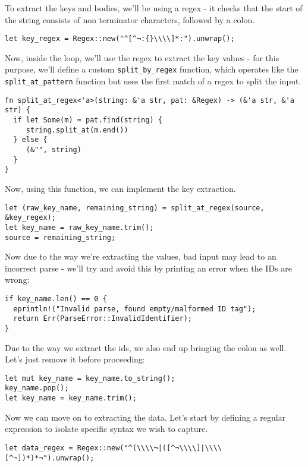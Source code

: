 \documentclass[11pt]{article}
\begin{document}
To extract the keys and bodies, we'll be using a regex - it checks that the start of the string consists of non terminator characters,
followed by a colon.
\begin{verbatim}
let key_regex = Regex::new("^[^¬:{}\\\\]*:").unwrap();
\end{verbatim}

Now, inside the loop, we'll use the regex to extract the key values - for this purpose, we'll define a custom \texttt{split\_by\_regex} function,
which operates like the \texttt{split\_at\_pattern} function but uses the first match of a regex to split the input.

\begin{verbatim}
fn split_at_regex<'a>(string: &'a str, pat: &Regex) -> (&'a str, &'a str) {
  if let Some(m) = pat.find(string) {
     string.split_at(m.end())
  } else {
     (&"", string)
  }
}
\end{verbatim}
Now, using this function, we can implement the key extraction.

\begin{verbatim}
let (raw_key_name, remaining_string) = split_at_regex(source, &key_regex);
let key_name = raw_key_name.trim();
source = remaining_string;
\end{verbatim}

Now due to the way we're extracting the values, bad input may lead to an incorrect parse - we'll try and avoid this by printing an error when the IDs are wrong:
\begin{verbatim}
if key_name.len() == 0 {
  eprintln!("Invalid parse, found empty/malformed ID tag");
  return Err(ParseError::InvalidIdentifier);
}
\end{verbatim}
Due to the way we extract the ids, we also end up bringing the colon as well. Let's just remove it before proceeding:
\begin{verbatim}
let mut key_name = key_name.to_string();
key_name.pop();
let key_name = key_name.trim();
\end{verbatim}

Now we can move on to extracting the data. Let's start by defining a regular expression to isolate specific syntax we wish to capture.
\begin{verbatim}
let data_regex = Regex::new("^(\\\\¬|([^¬\\\\]|\\\\[^¬])*)*¬").unwrap();
\end{verbatim}
\end{document}
